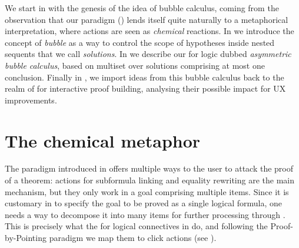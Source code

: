 We start in  with the genesis of the idea of bubble calculus,
coming from the observation that our  paradigm ()
lends itself quite naturally to a metaphorical interpretation, where actions are
seen as \emph{chemical} reactions. In  we introduce the concept
of \emph{bubble} as a way to control the scope of hypotheses inside nested
sequents that we call \emph{solutions}. In  we describe our
 for  logic dubbed \emph{asymmetric bubble calculus},
based on multiset  over solutions comprising at most one
conclusion. Finally in , we import ideas from this bubble
calculus back to the realm of  for interactive proof building, analysing
their possible impact for UX improvements.


\section{The chemical metaphor}

The  paradigm introduced in  offers multiple ways to
the user to attack the proof of a theorem:  actions for subformula linking
and equality rewriting are the main mechanism, but they only work in a goal
comprising multiple items. Since it is customary in  to specify
the goal to be proved as a single logical formula, one needs a way to decompose
it into many items for further processing through . This is precisely what
the  for logical connectives in  do, and
following the Proof-by-Pointing paradigm \cite{PbP} we map them to click
actions (see ).

